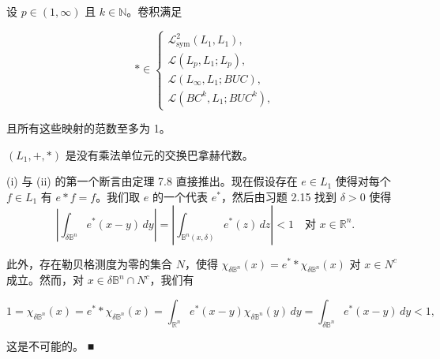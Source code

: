 \begin{corollary}

\begin{subitems}
\item

设 $ p \in (1,\infty) $ 且 $ k \in \mathbb{N} $。卷积满足

\begin{equation*}
* \in \begin{cases} \mathcal{L}_{\mathrm{sym}}^{2}(L_{1},L_{1}) , \\ \mathcal{L}(L_{p},L_{1};L_{p}) , \\ \mathcal{L}(L_{\infty},L_{1};BUC) , \\ \mathcal{L}(BC^{k},L_{1};BUC^{k}) , \end{cases}
\end{equation*}

且所有这些映射的范数至多为 1。

\item

$ (L_{1},+,*) $ 是没有乘法单位元的交换巴拿赫代数。

\proofhead
(i) 与 (ii) 的第一个断言由定理 7.8 直接推出。现在假设存在 $ e \in L_{1} $ 使得对每个 $ f \in L_{1} $ 有 $ e * f = f $。我们取 $ e $ 的一个代表 $ e^{*} $，然后由习题 2.15 找到 $ \delta > 0 $ 使得
\[
\left|\int_{\delta\mathbb{B}^{n}} e^{*}(x-y)\,dy\right| = \left|\int_{\mathbb{B}^{n}(x,\delta)} e^{*}(z)\,dz\right| < 1 \quad \text{对 } x \in \mathbb{R}^{n} .
\]

此外，存在勒贝格测度为零的集合 $ N $，使得 $ \chi_{\delta\mathbb{B}^{n}}(x) = e^{*} * \chi_{\delta\mathbb{B}^{n}}(x) $ 对 $ x \in N^{c} $ 成立。然而，对 $ x \in \delta\mathbb{B}^{n} \cap N^{c} $，我们有

\[
1 = \chi_{\delta\mathbb{B}^{n}}(x) = e^{*} * \chi_{\delta\mathbb{B}^{n}}(x) = \int_{\mathbb{R}^{n}} e^{*}(x-y)\chi_{\delta\mathbb{B}^{n}}(y)\,dy = \int_{\delta\mathbb{B}^{n}} e^{*}(x-y)\,dy < 1 ,
\]

这是不可能的。 \nobreak\hspace{0.35em}■

\end{subitems}

\end{corollary}

